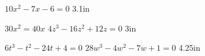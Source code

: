 {
    $10x^2 - 7x - 6 = 0$
}
{3.1in}


\myProblems
{
    $30x^2 = 40x$
}
{
    $4z^3 -16z^2 + 12z = 0$
}
{3in}


\myProblems
{
    $6t^3 - t^2 - 24t + 4 = 0$
}
{
    $28w^3 - 4w^2 - 7w + 1 = 0$
}
{4.25in}